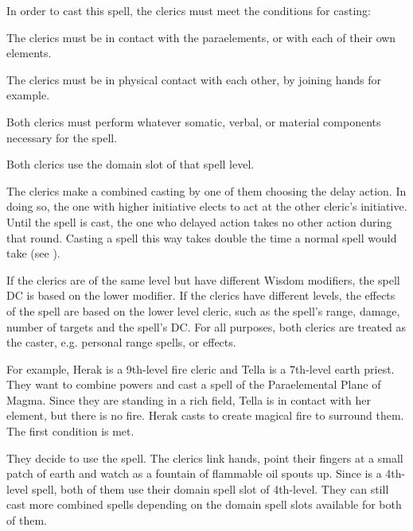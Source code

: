 In order to cast this spell, the clerics must meet the conditions for casting:
\begin{itemize*}
\item The clerics must be in contact with the paraelements, or with each of their own elements.
\item The clerics must be in physical contact with each other, by joining hands for example.
\item Both clerics must perform whatever somatic, verbal, or material components necessary for the spell.
\item Both clerics use the domain slot of that spell level.
\end{itemize*}

The clerics make a combined casting by one of them choosing the delay action. In doing so, the one with higher initiative elects to act at the other cleric's initiative. Until the spell is cast, the one who delayed action takes no other action during that round. Casting a spell this way takes double the time a normal spell would take (see ).


If the clerics are of the same level but have different Wisdom modifiers, the spell DC is based on the lower modifier. If the clerics have different levels, the effects of the spell are based on the lower level cleric, such as the spell's range, damage, number of targets and the spell's DC. For all purposes, both clerics are treated as the caster, e.g. personal range spells, or  effects.

For example, Herak is a 9th-level fire cleric and Tella is a 7th-level earth priest. They want to combine powers and cast a spell of the Paraelemental Plane of Magma. Since they are standing in a rich field, Tella is in contact with her element, but there is no fire. Herak casts  to create magical fire to surround them. The first condition is met.

They decide to use the  spell. The clerics link hands, point their fingers at a small patch of earth and watch as a fountain of flammable oil spouts up. Since  is a 4th-level spell, both of them use their domain spell slot of 4th-level. They can still cast more combined spells depending on the domain spell slots available for both of them.


